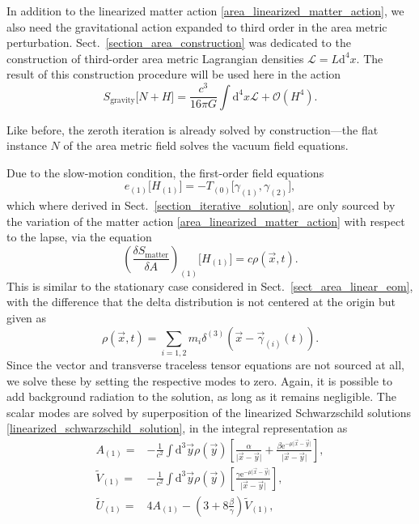 In addition to the linearized matter action \eqref{area_linearized_matter_action}, we also need the gravitational action expanded to third order in the area metric perturbation. Sect.~\ref{section_area_construction} was dedicated to the construction of third-order area metric Lagrangian densities $\mathcal L = L \mathrm d^4x$. The result of this construction procedure will be used here in the action
\begin{equation}
  S_\text{gravity}\lbrack N+H\rbrack = \frac{c^3}{16\pi G}\int \mathrm d^4x \mathcal L + \mathcal O(H^4).
\end{equation}

Like before, the zeroth iteration is already solved by construction---the flat instance $N$ of the area metric field solves the vacuum field equations.

Due to the slow-motion condition, the first-order field equations
\begin{equation}
  e_{(1)}\lbrack H_{(1)}\rbrack = - T_{(0)}\lbrack\gamma_{(1)},\gamma_{(2)}\rbrack,
\end{equation}
which where derived in Sect.~\ref{section_iterative_solution}, are only sourced by the variation of the matter action \eqref{area_linearized_matter_action} with respect to the lapse, via the equation
\begin{equation}
  \left(\frac{\delta S_\text{matter}}{\delta A}\right)_{(1)}\lbrack H_{(1)}\rbrack = c \rho(\vec x,t).
\end{equation}
This is similar to the stationary case considered in Sect.~\ref{sect_area_linear_eom}, with the difference that the delta distribution is not centered at the origin but given as
\begin{equation}
  \rho(\vec x,t) = \sum_{i=1,2} m_i \delta^{(3)}(\vec x - \vec\gamma_{(i)}(t)).
\end{equation}
Since the vector and transverse traceless tensor equations are not sourced at all, we solve these by setting the respective modes to zero. Again, it is possible to add background radiation to the solution, as long as it remains negligible. The scalar modes are solved by superposition of the linearized Schwarzschild solutions \eqref{linearized_schwarzschild_solution}, in the integral representation as
\begin{equation}\label{area_schwarzschild_integral}
  \begin{aligned}
    A_{(1)} = {} & -\frac{1}{c^2} \int\mathrm d^3\vec y\rho(\vec y)\left\lbrack\frac{\alpha}{\lvert\vec x-\vec y\rvert} + \frac{\beta\mathrm e^{-\mu\lvert\vec x-\vec y\rvert}}{\lvert\vec x-\vec y\rvert} \right\rbrack, \\
    \tilde V_{(1)} = {} & -\frac{1}{c^2} \int\mathrm d^3\vec y\rho(\vec y)\left\lbrack\frac{\gamma\mathrm e^{-\mu\lvert\vec x-\vec y\rvert}}{\lvert\vec x-\vec y\rvert} \right\rbrack, \\
    \tilde U_{(1)} = {} & 4 A_{(1)} - (3 + 8 \frac{\beta}{\gamma})\tilde V_{(1)},
  \end{aligned}
\end{equation}
